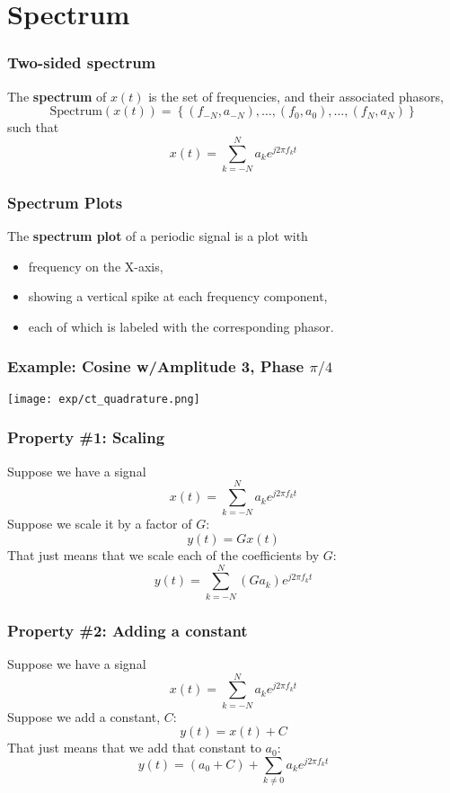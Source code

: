 \documentclass{beamer}
\begin{document}
\section[Spectrum]{Spectrum}
\setcounter{subsection}{1}

\begin{frame}
  \frametitle{Two-sided spectrum}

  The {\bf spectrum} of $x(t)$ is the set of frequencies, and their
  associated phasors,
  \[
  \mbox{Spectrum}\left( x(t) \right) =
  \left\{ (f_{-N},a_{-N}), \ldots, (f_0,a_0), \ldots, (f_N,a_N) \right\}
  \]
  such that
  \[
  x(t) = \sum_{k=-N}^N a_ke^{j2\pi f_kt}
  \]
\end{frame}

\begin{frame}
  \frametitle{Spectrum Plots}

  The {\bf spectrum plot} of a periodic signal is a plot with
  \begin{itemize}
  \item frequency on the X-axis,
  \item showing a vertical spike at each frequency component,
  \item each of which is labeled with the corresponding phasor.
  \end{itemize}
\end{frame}

\begin{frame}
  \frametitle{Example: Cosine w/Amplitude 3, Phase $\pi/4$}

  \centerline{\texttt{[image: exp/ct\_quadrature.png]}}
\end{frame}

\begin{frame}
  \frametitle{Property \#1: Scaling}

  Suppose we have a signal
  \[
  x(t) = \sum_{k=-N}^N a_ke^{j2\pi f_kt}
  \]
  Suppose we scale it by a factor of $G$:
  \[
  y(t) = Gx(t)
  \]
  That just means that we scale each of the coefficients by $G$:
  \[
  y(t)  = \sum_{k=-N}^N \left(Ga_k\right) e^{j2\pi f_kt}
  \]
\end{frame}

\begin{frame}
  \frametitle{Property \#2: Adding a constant}

  Suppose we have a signal
  \[
  x(t) = \sum_{k=-N}^N a_ke^{j2\pi f_kt}
  \]
  Suppose we add a constant, $C$:
  \[
  y(t) = x(t) + C
  \]
  That just means that we add that constant to $a_0$:
  \[
  y(t)  = (a_0+C) + \sum_{k\ne 0} a_k e^{j2\pi f_kt}
  \]
\end{frame}
\end{document}

